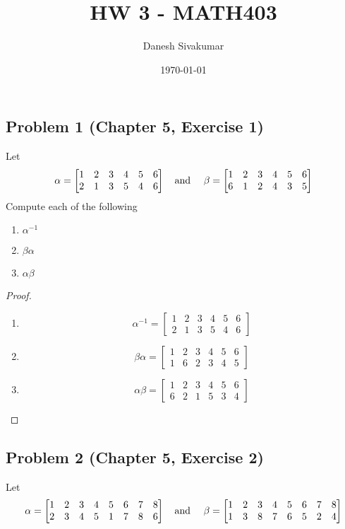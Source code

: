 \documentclass{article}
\title{HW 3 - MATH403}
\author{Danesh Sivakumar}
\date\today
\begin{document}
\maketitle 


\subsection*{Problem 1 (Chapter 5, Exercise 1)}
Let 
\[\alpha = \begin{bmatrix}
1 & 2 & 3 & 4 & 5 & 6 \\
2 & 1 & 3 & 5 & 4 & 6
\end{bmatrix} \text{\quad and \quad} \beta = \begin{bmatrix}
1 & 2 & 3 & 4 & 5 & 6 \\
6 & 1 & 2 & 4 & 3 & 5
\end{bmatrix}\]
Compute each of the following

\begin{enumerate}[label=\textbf{\alph*.}]
    \item $\alpha^{-1}$
    \item $\beta\alpha$
    \item $\alpha\beta$
\end{enumerate}
\begin{proof}
\begin{enumerate}[label=\textbf{\alph*.}]
    \item \[ \alpha^{-1} = \begin{bmatrix}
1 & 2 & 3 & 4 & 5 & 6 \\
2 & 1 & 3 & 5 & 4 & 6
\end{bmatrix}\]
    \item \[ \beta\alpha = \begin{bmatrix}
1 & 2 & 3 & 4 & 5 & 6 \\
1 & 6 & 2 & 3 & 4 & 5
\end{bmatrix}\]
    \item \[ \alpha\beta = \begin{bmatrix}
1 & 2 & 3 & 4 & 5 & 6 \\
6 & 2 & 1 & 5 & 3 & 4
\end{bmatrix}\]
\end{enumerate}
\end{proof}


\subsection*{Problem 2 (Chapter 5, Exercise 2)}
Let 
\[\alpha = \begin{bmatrix}
1 & 2 & 3 & 4 & 5 & 6 & 7 & 8 \\
2 & 3 & 4 & 5 & 1 & 7 & 8 & 6
\end{bmatrix} \text{\quad and \quad} \beta = \begin{bmatrix}
1 & 2 & 3 & 4 & 5 & 6 & 7 & 8 \\
1 & 3 & 8 & 7 & 6 & 5 & 2 & 4
\end{bmatrix}\]
\end{document}
